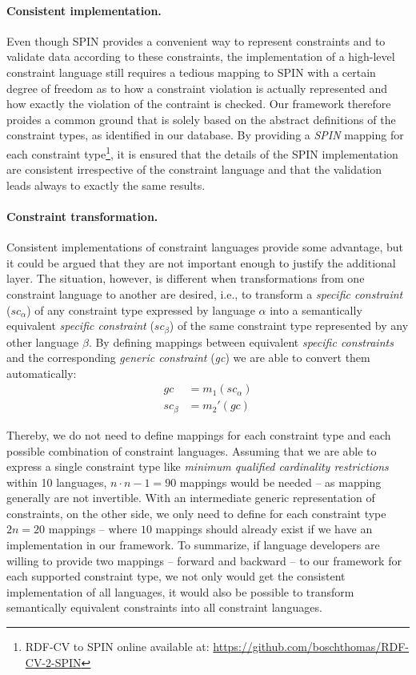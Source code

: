 \documentclass[a4paper,fontsize=11pt]{scrartcl}
\begin{document}
\paragraph{Consistent implementation.}
Even though SPIN provides a convenient way to represent constraints and to validate data according to these constraints, the implementation of a high-level constraint language still requires a tedious mapping to SPIN with a certain degree of freedom as to how a constraint violation is actually represented and how exactly the violation of the contraint is checked.
Our framework therefore proides a common ground that is solely based on the abstract definitions of the constraint types, as identified in our database. By providing a \emph{SPIN} mapping
for each constraint type\footnote{RDF-CV to SPIN online available at: \url{https://github.com/boschthomas/RDF-CV-2-SPIN}\label{RDF-CV-2-SPIN}}, it is ensured that the details of the SPIN implementation are consistent irrespective of the constraint language and that the validation leads always to exactly the same results.  


\paragraph{Constraint transformation.} Consistent implementations of constraint languages provide some advantage, but it could be argued that they are not important enough to justify the additional layer. The situation, however, is different when transformations from one constraint language to another are desired, i.e., to transform a \emph{specific constraint} (\emph{$sc_{\alpha}$}) of any constraint type expressed by language \emph{$\alpha$} into a semantically equivalent \emph{specific constraint} (\emph{$sc_{\beta}$}) of the same constraint type represented by any other language \emph{$\beta$}.
By defining mappings between equivalent \emph{specific constraints} and the corresponding \emph{generic constraint} (\emph{gc}) we are able to convert them automatically: 
\begin{align*}
  gc &=  m_1(sc_{\alpha}) \\
  sc_{\beta} &= m_2'(gc) 
\end{align*}

Thereby, we do not need to define mappings for each constraint type and each possible combination of constraint languages. Assuming that we are able to express a single constraint type like \emph{minimum qualified cardinality restrictions} within 10 languages, $n \cdot n-1 = 90$ mappings would be needed -- as mapping generally are not invertible. 
With an intermediate generic representation of constraints, on the other side, we only need to define for each constraint type $2n = 20$ mappings -- where $10$ mappings should already exist if we have an implementation in our framework. 
To summarize, if language developers are willing to provide two mappings -- forward and backward -- to our framework for each supported constraint type, we not only would get the consistent implementation of all languages, it would also be possible to transform semantically equivalent constraints into all constraint languages.
\end{document}

